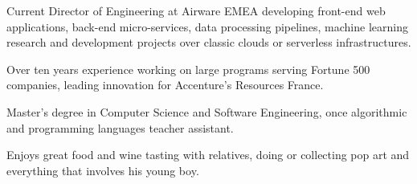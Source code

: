 
\begin{cvparagraph}

Current Director of Engineering at Airware EMEA developing front-end web applications, back-end micro-services, data processing pipelines, machine learning research and development projects over classic clouds or serverless infrastructures.

Over ten years experience working on large programs serving Fortune 500 companies, leading innovation for Accenture’s Resources France.

Master’s degree in Computer Science and Software Engineering, once algorithmic and programming languages teacher assistant.

Enjoys great food and wine tasting with relatives, doing or collecting pop art and everything that involves his young boy.

\end{cvparagraph}

